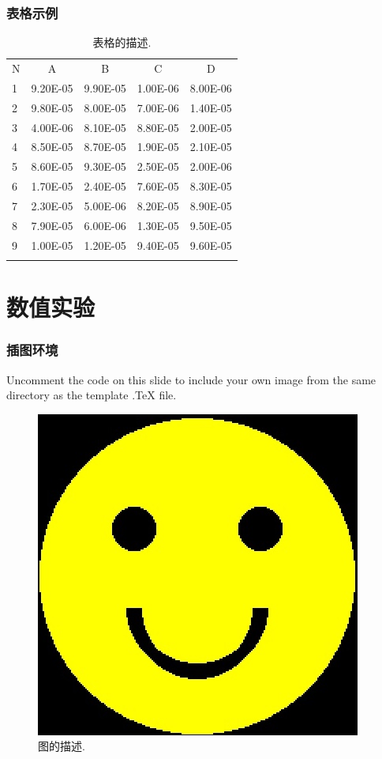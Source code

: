 \documentclass[notheorems,11pt,compress]{beamer}
\numberwithin{figure}{section}
\numberwithin{table}{section}
\numberwithin{equation}{section}
\theoremstyle{plain}
\numberwithin{theorem}{section}
\numberwithin{definition}{section}
\numberwithin{lemma}{section}
\numberwithin{proposition}{section}
\numberwithin{corollary}{section}
\theoremstyle{example}
\begin{document}

\begin{frame}
	\frametitle{表格示例}
	\begin{table}[htp!]
		\centering
		\renewcommand\arraystretch{1.2} %
		\caption{表格的描述.}
		\label{tab3:NumError}
		\begin{tabularx}{0.9\textwidth}{|P{1cm}|C|C|C|C|}
			\Xhline{2\arrayrulewidth}
			N & A        & B        & C        & D        \\
			\Xhline{2\arrayrulewidth}
			1 & 9.20E-05 & 9.90E-05 & 1.00E-06 & 8.00E-06 \\
			2 & 9.80E-05 & 8.00E-05 & 7.00E-06 & 1.40E-05 \\
			3 & 4.00E-06 & 8.10E-05 & 8.80E-05 & 2.00E-05 \\
			4 & 8.50E-05 & 8.70E-05 & 1.90E-05 & 2.10E-05 \\
			5 & 8.60E-05 & 9.30E-05 & 2.50E-05 & 2.00E-06 \\
			6 & 1.70E-05 & 2.40E-05 & 7.60E-05 & 8.30E-05 \\
			7 & 2.30E-05 & 5.00E-06 & 8.20E-05 & 8.90E-05 \\
			8 & 7.90E-05 & 6.00E-06 & 1.30E-05 & 9.50E-05 \\
			9 & 1.00E-05 & 1.20E-05 & 9.40E-05 & 9.60E-05 \\
			\Xhline{2\arrayrulewidth}
		\end{tabularx}
	\end{table}

\end{frame}



\section{数值实验}

\begin{frame}
	\frametitle{插图环境}

	Uncomment the code on this slide to include your own image from the same directory as the template .TeX file.
	\begin{figure}[htp!]
		\centering
		\includegraphics[width=0.5\linewidth]{image1}
		\caption{图的描述.} \label{fig:A}
	\end{figure}
\end{frame}
\end{document}
